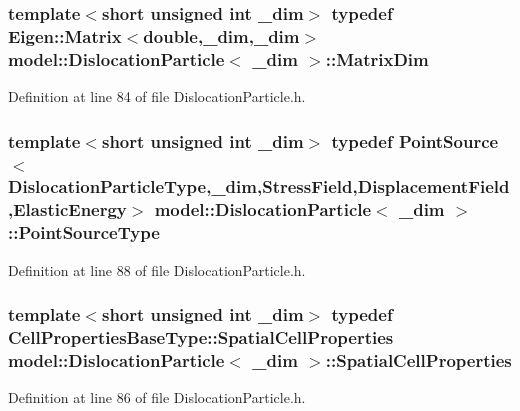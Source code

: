 \subsubsection[{Matrix\+Dim}]{\setlength{\rightskip}{0pt plus 5cm}template$<$short unsigned int \+\_\+dim$>$ typedef Eigen\+::\+Matrix$<$double,\+\_\+dim,\+\_\+dim$>$ {\bf model\+::\+Dislocation\+Particle}$<$ \+\_\+dim $>$\+::{\bf Matrix\+Dim}}\label{structmodel_1_1_dislocation_particle_a4fb98d6dbd350e248452f5bbcb3078f3}


Definition at line 84 of file Dislocation\+Particle.\+h.

\hypertarget{structmodel_1_1_dislocation_particle_ad7cb10ddeebde76213ecd273bf323bf0}{}
\subsubsection[{Point\+Source\+Type}]{\setlength{\rightskip}{0pt plus 5cm}template$<$short unsigned int \+\_\+dim$>$ typedef {\bf Point\+Source}$<${\bf Dislocation\+Particle\+Type},\+\_\+dim,{\bf Stress\+Field},{\bf Displacement\+Field},{\bf Elastic\+Energy}$>$ {\bf model\+::\+Dislocation\+Particle}$<$ \+\_\+dim $>$\+::{\bf Point\+Source\+Type}}\label{structmodel_1_1_dislocation_particle_ad7cb10ddeebde76213ecd273bf323bf0}


Definition at line 88 of file Dislocation\+Particle.\+h.

\hypertarget{structmodel_1_1_dislocation_particle_aff639d1f8cef2fdfe9fd8b69619544d7}{}
\subsubsection[{Spatial\+Cell\+Properties}]{\setlength{\rightskip}{0pt plus 5cm}template$<$short unsigned int \+\_\+dim$>$ typedef {\bf Cell\+Properties\+Base\+Type\+::\+Spatial\+Cell\+Properties} {\bf model\+::\+Dislocation\+Particle}$<$ \+\_\+dim $>$\+::{\bf Spatial\+Cell\+Properties}}\label{structmodel_1_1_dislocation_particle_aff639d1f8cef2fdfe9fd8b69619544d7}


Definition at line 86 of file Dislocation\+Particle.\+h.

